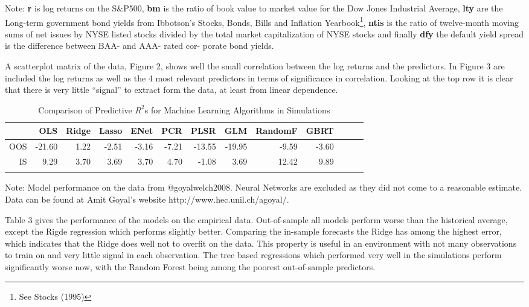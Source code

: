 \documentclass[]{article}
\let\rmarkdownfootnote\footnote%
\def\footnote{\protect\rmarkdownfootnote}
\begin{document}
Note: \textbf{r} is log returns on the S\&P500, \textbf{bm} is the ratio
of book value to market value for the Dow Jones Industrial Average,
\textbf{lty} are the Long-term government bond yields from Ibbotson's
Stocks, Bonds, Bills and Inflation Yearbook\footnote{See Stocks (1995)},
\textbf{ntis} is the ratio of twelve-month moving sums of net issues by
NYSE listed stocks divided by the total market capitalization of NYSE
stocks and finally \textbf{dfy} the default yield spread is the
difference between BAA- and AAA- rated cor- porate bond yields.

A scatterplot matrix of the data, Figure 2, shows well the small
correlation between the log returns and the predictors. In Figure 3 are
included the log returns as well as the 4 most relevant predictors in
terms of significance in correlation. Looking at the top row it is clear
that there is very little ``signal'' to extract form the data, at least
from linear dependence.

\begin{table}[ht]
\begin{threeparttable}
\centering
\setlength{\tabcolsep}{6pt}
\caption{Comparison of Predictive $R^2$s for Machine Learning Algorithms in Simulations}
\begin{tabular}{rrrrrrrrrrrrr}
  \Xhline{2\arrayrulewidth}
 & OLS & Ridge & Lasso & ENet & PCR & PLSR & GLM & RandomF & GBRT\\ 
  \hline
OOS & -21.60 & 1.22 & -2.51 & -3.16 & -7.21 & -13.55 & -19.95 & -9.59 & -3.60 \\
IS & 9.29 & 3.70 & 3.69 & 3.70 & 4.70 & -1.08 & 3.69 & 12.42 & 9.89  \\ 
   \Xhline{2\arrayrulewidth}
\end{tabular}
\begin{tablenotes}
      \small
      \item Note: Model performance on the data from @goyalwelch2008. Neural Networks are excluded as they did not come to a reasonable estimate. Data can be found at Amit Goyal's website http://www.hec.unil.ch/agoyal/.
    \end{tablenotes}
  \end{threeparttable}
\label{table:data}
\end{table}

Table 3 gives the performance of the models on the empirical data.
Out-of-sample all models perform worse than the historical average,
except the Rigde regression which performs slightly better. Comparing
the in-sample forecasts the Ridge has among the highest error, which
indicates that the Ridge does well not to overfit on the data. This
property is useful in an environment with not many observations to train
on and very little signal in each observation. The tree based
regressions which performed very well in the simulations perform
significantly worse now, with the Random Forest being among the poorest
out-of-sample predictors.
\end{document}
